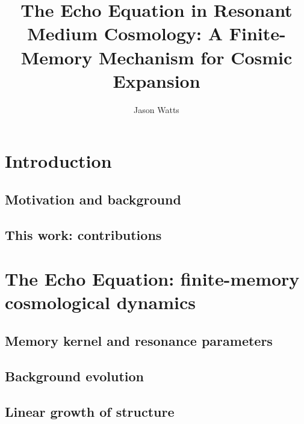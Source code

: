 \documentclass[a4paper,11pt]{article}
\title{The Echo Equation in Resonant Medium Cosmology: A Finite-Memory Mechanism for Cosmic Expansion}
\author[a]{Jason Watts}
\affiliation[a]{The Experimentalist Lab}
\begin{document}
\maketitle
\flushbottom

\section{Introduction}
\label{sec:intro}

\subsection{Motivation and background}

\subsection{This work: contributions}

\section{The Echo Equation: finite-memory cosmological dynamics}
\label{sec:theory}

\subsection{Memory kernel and resonance parameters}

\subsection{Background evolution}

\subsection{Linear growth of structure}
\end{document}
